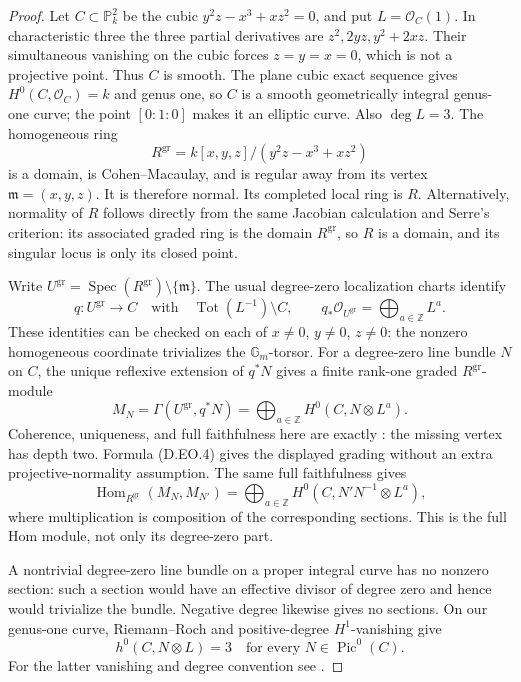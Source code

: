 \begin{proof}
Let $C\subset\mathbb P^2_k$ be the cubic
$y^2z-x^3+xz^2=0$, and put $L=\mathcal O_C(1)$. In characteristic
three the three partial derivatives are $z^2,2yz,y^2+2xz$.
Their simultaneous vanishing on the cubic forces $z=y=x=0$,
which is not a projective point. Thus $C$ is smooth. The plane
cubic exact sequence gives $H^0(C,\mathcal O_C)=k$ and genus one,
so $C$ is a smooth geometrically integral genus-one curve; the
point $[0:1:0]$ makes it an elliptic curve. Also $\deg L=3$.
The homogeneous ring
\[
 R^{\mathrm{gr}}=k[x,y,z]/(y^2z-x^3+xz^2)
\]
is a domain, is Cohen--Macaulay, and is regular away from its
vertex $\mathfrak m=(x,y,z)$. It is therefore normal. Its completed
local ring is $R$. Alternatively, normality of $R$ follows directly
from the same Jacobian calculation and Serre's criterion: its
associated graded ring is the domain $R^{\mathrm{gr}}$, so $R$ is
a domain, and its singular locus is only its closed point.

Write $U^{\mathrm{gr}}=\operatorname{Spec}(R^{\mathrm{gr}})
\setminus\{\mathfrak m\}$. The usual degree-zero localization
charts identify
\[
 q:U^{\mathrm{gr}}\longrightarrow C
 \quad\text{with}\quad \operatorname{Tot}(L^{-1})\setminus C,
 \qquad q_*\mathcal O_{U^{\mathrm{gr}}}
       =\bigoplus_{a\in\mathbb Z} L^a.
 \tag{D.EO.4}
\]
These identities can be checked on each of $x\ne0$, $y\ne0$,
$z\ne0$: the nonzero homogeneous coordinate trivializes the
$\mathbb G_m$-torsor. For a degree-zero line bundle $N$ on $C$,
the unique reflexive extension of $q^*N$ gives a finite rank-one
graded $R^{\mathrm{gr}}$-module
\[
 M_N=\Gamma(U^{\mathrm{gr}},q^*N)
    =\bigoplus_{a\in\mathbb Z}H^0(C,N\otimes L^a).
 \tag{D.EO.5}
\]
Coherence, uniqueness, and full faithfulness here are exactly
\citet[Tag 0EBJ, Lemma 31.13.12, including its proof]{StacksDEllipticOrder}:
the missing vertex has depth two. Formula (D.EO.4) gives the
displayed grading without an extra projective-normality assumption.
The same full faithfulness gives
\[
 \operatorname{Hom}_{R^{\mathrm{gr}}}(M_N,M_{N'})
  =\bigoplus_{a\in\mathbb Z}
       H^0(C,N'N^{-1}\otimes L^a),
 \tag{D.EO.6}
\]
where multiplication is composition of the corresponding sections.
This is the full Hom module, not only its degree-zero part.

A nontrivial degree-zero line bundle on a proper integral curve has
no nonzero section: such a section would have an effective divisor
of degree zero and hence would trivialize the bundle. Negative
degree likewise gives no sections. On our genus-one curve,
Riemann--Roch and positive-degree $H^1$-vanishing give
\[
 h^0(C,N\otimes L)=3
 \quad\text{for every }N\in\operatorname{Pic}^0(C).
 \tag{D.EO.7}
\]
For the latter vanishing and degree convention see
\citet[Tags 0E39 and 0AYQ, Lemma 53.22.1 and Definition 33.44.1]{StacksDEllipticOrder}.


\end{proof}
